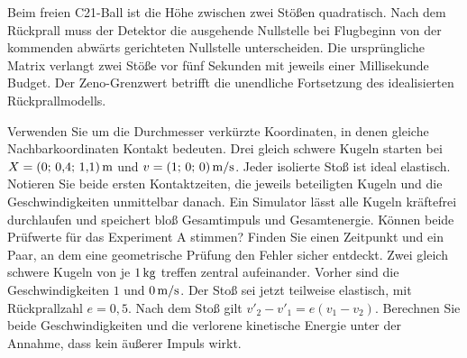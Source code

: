 Beim freien C21-Ball ist die Höhe zwischen zwei Stößen quadratisch. Nach dem Rückprall muss der Detektor die ausgehende Nullstelle bei Flugbeginn von der kommenden abwärts gerichteten Nullstelle unterscheiden. Die ursprüngliche Matrix verlangt zwei Stöße vor fünf Sekunden mit jeweils einer Millisekunde Budget. Der Zeno-Grenzwert betrifft die unendliche Fortsetzung des idealisierten Rückprallmodells.


Verwenden Sie um die Durchmesser verkürzte Koordinaten, in denen gleiche Nachbarkoordinaten Kontakt bedeuten. Drei gleich schwere Kugeln starten bei \(X=(0;\,0{,}4;\,1{,}1)\,\mathrm{m}\) und \(v=(1;\,0;\,0)\,\mathrm{m/s}\). Jeder isolierte Stoß ist ideal elastisch. Notieren Sie beide ersten Kontaktzeiten, die jeweils beteiligten Kugeln und die Geschwindigkeiten unmittelbar danach.
Ein Simulator lässt alle Kugeln kräftefrei durchlaufen und speichert bloß Gesamtimpuls und Gesamtenergie. Können beide Prüfwerte für das Experiment A stimmen? Finden Sie einen Zeitpunkt und ein Paar, an dem eine geometrische Prüfung den Fehler sicher entdeckt.
Zwei gleich schwere Kugeln von je \(1\,\mathrm{kg}\) treffen zentral aufeinander. Vorher sind die Geschwindigkeiten \(1\) und \(0\,\mathrm{m/s}\). Der Stoß sei jetzt teilweise elastisch, mit Rückprallzahl \(e=0{,}5\). Nach dem Stoß gilt \(v'_2-v'_1=e(v_1-v_2)\). Berechnen Sie beide Geschwindigkeiten und die verlorene kinetische Energie unter der Annahme, dass kein äußerer Impuls wirkt.

\schreibfeld

